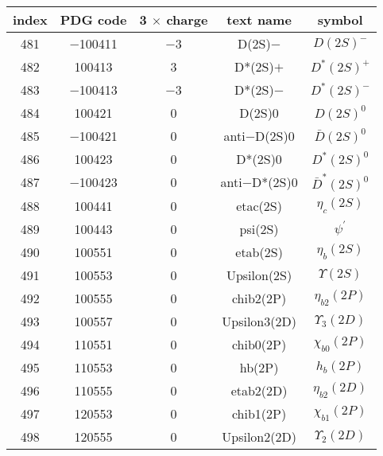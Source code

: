 \documentclass{article}
\begin{document}
\begin{table}[!htbp]
\centering
\begin{tabular}{|c|c|c|c|c|}
\hline
index & PDG code & 3 $\times$ charge & text name & symbol \\
\hline
481 & $-$100411 & $-$3 & D(2S)$-$ & $D(2S)^{-}$ \\
\hline
482 & 100413 & 3 & D*(2S)$+$ & $D^{*}(2S)^{+}$ \\
\hline
483 & $-$100413 & $-$3 & D*(2S)$-$ & $D^{*}(2S)^{-}$ \\
\hline
484 & 100421 & 0 & D(2S)0 & $D(2S)^{0}$ \\
\hline
485 & $-$100421 & 0 & anti$-$D(2S)0 & $\bar{D}(2S)^{0}$ \\
\hline
486 & 100423 & 0 & D*(2S)0 & $D^{*}(2S)^{0}$ \\
\hline
487 & $-$100423 & 0 & anti$-$D*(2S)0 & $\bar{D}^{*}(2S)^{0}$ \\
\hline
488 & 100441 & 0 & eta\underline{\hspace{0.6em}}c(2S) & $\eta_{c}(2S)$ \\
\hline
489 & 100443 & 0 & psi(2S) & $\psi^{\prime}$ \\
\hline
490 & 100551 & 0 & eta\underline{\hspace{0.6em}}b(2S) & $\eta_{b}(2S)$ \\
\hline
491 & 100553 & 0 & Upsilon(2S) & $\Upsilon(2S)$ \\
\hline
492 & 100555 & 0 & chi\underline{\hspace{0.6em}}b2(2P) & $\eta_{b2}(2P)$ \\
\hline
493 & 100557 & 0 & Upsilon\underline{\hspace{0.6em}}3(2D) & $\Upsilon_{3}(2D)$ \\
\hline
494 & 110551 & 0 & chi\underline{\hspace{0.6em}}b0(2P) & $\chi_{b0}(2P)$ \\
\hline
495 & 110553 & 0 & h\underline{\hspace{0.6em}}b(2P) & $h_{b}(2P)$ \\
\hline
496 & 110555 & 0 & eta\underline{\hspace{0.6em}}b2(2D) & $\eta_{b2}(2D)$ \\
\hline
497 & 120553 & 0 & chi\underline{\hspace{0.6em}}b1(2P) & $\chi_{b1}(2P)$ \\
\hline
498 & 120555 & 0 & Upsilon\underline{\hspace{0.6em}}2(2D) & $\Upsilon_{2}(2D)$ \\

\end{tabular}
\end{table}
\end{document}
